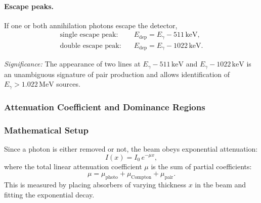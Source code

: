 \paragraph{Escape peaks.}
If one or both annihilation photons escape the detector,
\begin{align}
  \label{eq:lec06:escape_peaks}
  \text{single escape peak:}&\quad E_\text{dep} = E_\gamma - 511\,\text{keV}, \\
  \label{eq:lec06:double_escape}
  \text{double escape peak:}&\quad E_\text{dep} = E_\gamma - 1022\,\text{keV}.
\end{align}

\textit{Significance:} The appearance of two lines at $E_\gamma - 511\,\text{keV}$
and $E_\gamma - 1022\,\text{keV}$ is an unambiguous signature of pair production
and allows identification of $E_\gamma > 1.022\,\text{MeV}$ sources.

\subsubsection{Attenuation Coefficient and Dominance Regions}
\label{subsubsec:lec06:attenuation}

\subsubsection*{Mathematical Setup}
Since a photon is either removed or not, the beam obeys exponential attenuation:
\begin{equation}
  \label{eq:lec06:attenuation}
  \boxed{I(x) = I_0\,e^{-\mu x},}
\end{equation}
where the total linear attenuation coefficient $\mu$ is the sum of partial
coefficients:
\begin{equation}
  \label{eq:lec06:mu_total}
  \boxed{\mu = \mu_\text{photo} + \mu_\text{Compton} + \mu_\text{pair}.}
\end{equation}
This is measured by placing absorbers of varying thickness $x$ in the beam and
fitting the exponential decay.

